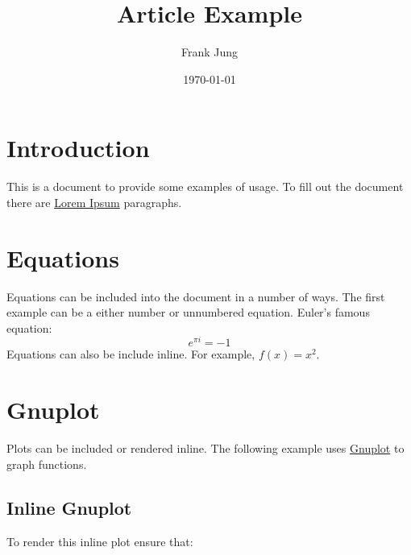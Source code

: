 \documentclass[10pt,a4paper]{article}
\title{\LaTeXe{} Article Example}
\author{Frank Jung}
\date{\today}
\begin{document}
\maketitle{}
\newpage{}

\tableofcontents{}
\listoffigures{}
\listoflistings{}
\listoftables{}
\newpage{}

\newpage{}

\newcommand{\sectionbreak}{\clearpage}

\section*{Introduction}

This is a \LaTeXe{} document to provide some examples of usage. To fill out the
document there are \href{http://www.lipsum.com/}{Lorem Ipsum} paragraphs.

\lipsum[1]

\section*{Equations}

Equations can be included into the document in a number of ways. The first
example can be a either number or unnumbered equation. Euler's famous equation:
\begin{equation}
  e^{\pi i} = -1
\end{equation}
Equations can also be include inline. For example, $f(x) = x^2$.\par

\lipsum[2]

\sectionbreak{}

\section*{Gnuplot}

Plots can be included or rendered inline. The following example uses
\href{http://www.gnuplot.info/}{Gnuplot} to graph functions.

\subsection*{Inline Gnuplot}

To render this inline plot ensure that:
\end{document}
